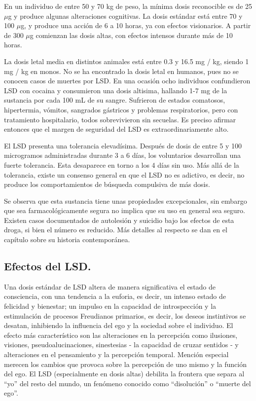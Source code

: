 En un individuo de entre 50 y 70 kg de peso, la mínima dosis reconocible es de 25 $\mu$g y produce algunas alteraciones cognitivas. La dosis estándar está entre 70 y 100 $\mu$g, y produce una acción de 6 a 10 horas, ya con efectos visionarios. A partir de 300 $\mu$g comienzan las dosis altas, con efectos intensos durante más de 10 horas.

La dosis letal media en distintos animales está entre 0.3 y 16.5 mg / kg, siendo 1 mg / kg en monos. No se ha encontrado la dosis letal en humanos, pues no se conocen casos de muertes por LSD. En una ocasión ocho individuos confundieron LSD con cocaina y consumieron una dosis altisima, hallando 1-7 mg de la sustancia por cada 100 mL de su sangre. Sufrieron de estados comatosos, hipertermia, vómitos, sangrados gástricos y problemas respiratorios, pero con tratamiento hospitalario, todos sobrevivieron sin secuelas. Es preciso afirmar entonces que el margen de seguridad del LSD es extraordinariamente alto.

El LSD presenta una tolerancia elevadísima. Después de dosis de entre 5 y 100 microgramos administradas durante 3 a 6 días, los voluntarios desarrollan una fuerte tolerancia. Esta desaparece en torno a los 4 días sin uso. Más allá de la tolerancia, existe un consenso general en que el LSD no es adictivo, es decir, no produce los comportamientos de búsqueda compulsiva de más dosis.

Se observa que esta sustancia tiene unas propiedades excepcionales, sin embargo que sea farmacológicamente segura no implica que su uso en general sea seguro. Existen casos documentados de autolesión y suicidio bajo los efectos de esta droga, si bien el número es reducido. Más detalles al respecto se dan en el capítulo sobre su historia contemporánea.

\newpage

\subsection{Efectos del LSD.}

Una dosis estándar de LSD altera de manera significativa el estado de consciencia, con una tendencia a la euforia, es decir, un intenso estado de felicidad y bienestar; un impulso en la capacidad de introspección y la estimulación de procesos Freudianos primarios, es decir, los deseos instintivos se desatan, inhibiendo la influencia del ego y la sociedad sobre el individuo. El efecto más característico son las alteraciones en la percepción como ilusiones, visiones, pseudoalucinaciones, sinestesias - la capacidad de cruzar sentidos - y alteraciones en el pensamiento y la percepción temporal. Mención especial merecen los cambios que provoca sobre la percepción de uno mismo y la función del ego. El LSD (especialmente en dosis altas) debilita la frontera que separa al \enquote{yo} del resto del mundo, un fenómeno conocido como \enquote{disolución} o \enquote{muerte del ego}.

